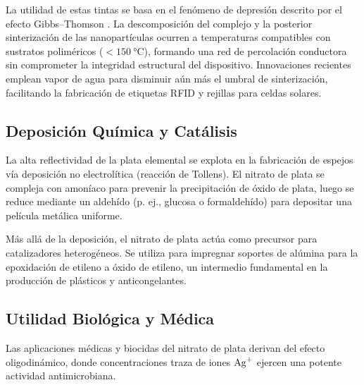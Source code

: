 \documentclass[pdflatex,sn-mathphys-num]{sn-jnl}
\theoremstyle{thmstyleone}%
\theoremstyle{thmstyletwo}%
\theoremstyle{thmstylethree}%
\begin{document}
La utilidad de estas tintas se basa en el fenómeno de depresión descrito por el
efecto Gibbs--Thomson \cite{Castro2005, Asoro2009}. La descomposición del complejo y
la posterior sinterización de las nanopartículas ocurren a temperaturas
compatibles con sustratos poliméricos ($< \qty{150}{\degreeCelsius}$), formando
una red de percolación conductora sin comprometer la integridad estructural del
dispositivo. Innovaciones recientes emplean vapor de agua para disminuir aún más
el umbral de sinterización, facilitando la fabricación de etiquetas RFID y
rejillas para celdas solares.

\subsection{Deposición Química y Catálisis}
La alta reflectividad de la plata elemental se explota en la fabricación de
espejos vía deposición no electrolítica (reacción de Tollens). El nitrato de
plata se compleja con amoníaco para prevenir la precipitación de óxido de plata,
luego se reduce mediante un aldehído (p. ej., glucosa o formaldehído) para
depositar una película metálica uniforme.

Más allá de la deposición, el nitrato de plata actúa como precursor para
catalizadores heterogéneos. Se utiliza para impregnar soportes de alúmina para
la epoxidación de etileno a óxido de etileno, un intermedio fundamental en la
producción de plásticos y anticongelantes.

\subsection{Utilidad Biológica y Médica}
Las aplicaciones médicas y biocidas del nitrato de plata derivan del efecto
oligodinámico, donde concentraciones traza de iones $\ce{Ag+}$ ejercen una
potente actividad antimicrobiana.
\end{document}
